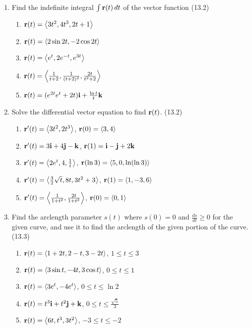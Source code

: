 \begin{enumerate}
    \newpage

    \item Find the indefinite integral $\int\mathbf{r}(t)\,d{t}$ of the vector function (13.2)

      \begin{enumerate}
        \item $\mathbf{r}(t) = \left<3t^2, 4t^3, 2t+1\right>$
        \item $\mathbf{r}(t) = \left<2\sin2t,-2\cos2t\right>$
        \item $\mathbf{r}(t) = \left<e^t, 2e^{-t}, e^{3t} \right>$
        \item $\mathbf{r}(t) = \left<\frac{1}{t+2}, \frac{1}{(t+2)^2}, \frac{2t}{t^2+2}\right>$
        \item $\mathbf{r}(t) = (e^{2t}e^t + 2t)\mathbf{i} + \frac{\ln t}{t}\mathbf{k}$
      \end{enumerate}

    \item Solve the differential vector equation to find $\mathbf{r}(t)$. (13.2)

      \begin{enumerate}
        \item $\mathbf{r}'(t) = \left<3t^2, 2t^3\right>$, $\mathbf{r}(0) = \left<3,4\right>$
        \item $\mathbf{r}'(t) = 3\mathbf{i}+4\mathbf{j}-\mathbf{k}$, $\mathbf{r}(1)=\mathbf{i}-\mathbf{j}+2\mathbf{k}$
        \item $\mathbf{r}'(t) = \left<2e^t, 4, \frac{1}{t}\right>$, $\mathbf{r}(\ln 3)=\left<5, 0, \ln(\ln 3)\right>$
        \item $\mathbf{r}'(t) = \left<\frac{3}{2}\sqrt{t}, 8t, 3t^2+3\right>$, $\mathbf{r}(1) = \left<1, -3, 6\right>$
        \item $\mathbf{r}'(t) = \left<\frac{1}{1+t^2},\frac{2t}{1+t^2}\right>$, $\mathbf{r}(0) = \left<0, 1\right>$
      \end{enumerate}

    \item Find the arclength parameter $s(t)$ where $s(0)=0$ and $\frac{ds}{dt}\geq 0$ for the given curve, and use it to find the arclength of the given portion of the curve. (13.3)

      \begin{enumerate}
        \item $\mathbf{r}(t) = \left<1+2t, 2-t, 3-2t\right>$, $1\leq t\leq 3$
        \item $\mathbf{r}(t) = \left< 3\sin t, -4t, 3\cos t \right>$, $0\leq t\leq 1$
        \item $\mathbf{r}(t) = \left<3e^t, -4e^t\right>$, $0\leq t\leq \ln 2$
        \item $\mathbf{r}(t) = t^3\mathbf{i} + t^2\mathbf{j} + \mathbf{k}$, $0\leq t\leq \frac{\sqrt{5}}{3}$
        \item $\mathbf{r}(t) = \left<6t, t^3, 3t^2\right>$, $-3\leq t\leq -2$
      \end{enumerate}


\end{enumerate}
